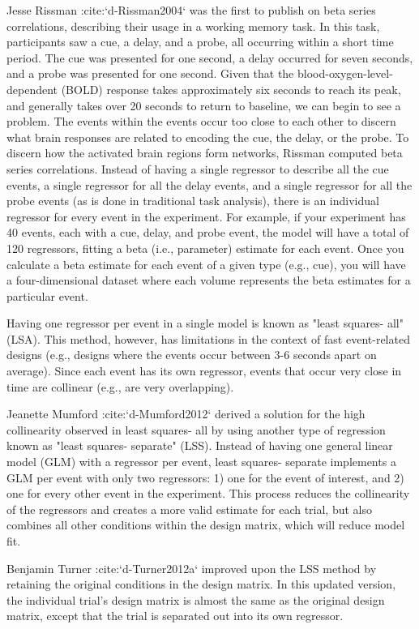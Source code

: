 \documentclass[phd,appendix,figures]{uithesis}
\begin{document}
Jesse Rissman :cite:`d-Rissman2004` was the first to publish on beta series
correlations, describing their usage in a working memory task.
In this task, participants saw a cue, a delay, and a probe, all occurring
within a short time period.
The cue was presented for one second, a delay occurred for seven seconds,
and a probe was presented for one second.
Given that the blood-oxygen-level-dependent (BOLD) response
takes approximately six seconds to reach its peak, and generally takes over
20 seconds to return to baseline, we can begin to see a problem.
The events within the events occur too close to each other to discern what
brain responses are related to encoding the cue, the delay, or the probe.
To discern how the activated brain regions form networks, Rissman
computed beta series correlations.
Instead of having a single regressor to describe all the cue events,
a single regressor for all the delay events, and a single regressor for all the
probe events (as is done in traditional task analysis),
there is an individual regressor for every event in the experiment.
For example, if your experiment has 40 events, each with a cue, delay, and
probe event, the model will have a total of 120 regressors, fitting a beta
(i.e., parameter) estimate for each event.
Once you calculate a beta estimate for each event of a given type
(e.g., cue), you will have a four-dimensional dataset where each volume
represents the beta estimates for a particular event.

Having one regressor per event in a single model is known as "least squares- all" (LSA).
This method, however, has limitations in the context of fast event-related
designs (e.g., designs where the events occur between 3-6
seconds apart on average).
Since each event has its own regressor, events that occur very close in time
are collinear (e.g., are very overlapping).

Jeanette Mumford :cite:`d-Mumford2012` derived a solution for
the high collinearity observed in least squares- all by using another
type of regression known as "least squares- separate" (LSS).
Instead of having one general linear model (GLM) with a regressor per event,
least squares- separate implements a GLM per event with only two regressors:
1) one for the event of interest, and 2) one for every other event in the
experiment.
This process reduces the collinearity of the regressors and creates a more valid
estimate for each trial, but also combines all other conditions
within the design matrix, which will reduce model fit.

Benjamin Turner :cite:`d-Turner2012a` improved upon the LSS method by retaining
the original conditions in the design matrix.
In this updated version, the individual trial's design matrix is almost the same
as the original design matrix, except that the trial is separated out into its
own regressor.
\end{document}
